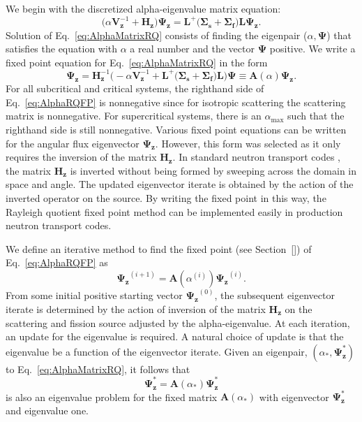 We begin with the discretized alpha-eigenvalue matrix equation:
\begin{equation}
	\big ( \alpha \mathbf{V}_{\mathbf{z}}^{-1} + \mathbf{H_{z}} \big ) \mathbf{\Psi_{z}} = \mathbf{L}^{+} \big ( \mathbf{\Sigma_{s}} + \mathbf{\Sigma_{f}} \big ) \mathbf{L} \mathbf{\Psi_{z}}.
	\label{eq:AlphaMatrixRQ}
\end{equation}
Solution of Eq.~\ref{eq:AlphaMatrixRQ} consists of finding the eigenpair ($\alpha,\mathbf{\Psi}$) that satisfies the equation with $\alpha$ a real number and the vector $\mathbf{\Psi}$ positive. We write a fixed point equation for Eq.~\ref{eq:AlphaMatrixRQ} in the form
\begin{equation}
	\mathbf{\Psi_{z}} = \mathbf{H}^{-1}_{\mathbf{z}} \big ( -\alpha \mathbf{V}_{\mathbf{z}}^{-1} + \mathbf{L}^{+} \big ( \mathbf{\Sigma_{s}} + \mathbf{\Sigma_{f}} \big ) \mathbf{L} \big ) \mathbf{\Psi} \equiv \mathbf{A}(\alpha) \mathbf{\Psi_{z}}.
	\label{eq:AlphaRQFP}
\end{equation}
For all subcritical and critical systems, the righthand side of Eq.~\ref{eq:AlphaRQFP} is nonnegative since for isotropic scattering the scattering matrix is nonnegative. For supercritical systems, there is an $\alpha_{\text{max}}$ such that the righthand side is still nonnegative. Various fixed point equations can be written for the angular flux eigenvector $\mathbf{\Psi_{z}}$. However, this form was selected as it only requires the inversion of the matrix $\mathbf{H_{z}}$. In standard neutron transport codes \cite{hanebutte_ardra_1999} \cite{alcouffe2005partisn}, the matrix $\mathbf{H_{z}}$ is inverted without being formed by sweeping across the domain in space and angle. The updated eigenvector iterate is obtained by the action of the inverted operator on the source. By writing the fixed point in this way, the Rayleigh quotient fixed point method can be implemented easily in production neutron transport codes.

We define an iterative method to find the fixed point (see Section~\ref{}) of Eq.~\ref{eq:AlphaRQFP} as
\begin{equation}
	\mathbf{\Psi_{z}}^{(i+1)} = \mathbf{A}(\alpha^{(i)}) \mathbf{\Psi_{z}}^{(i)}.
\end{equation}
From some initial positive starting vector $\mathbf{\Psi_{z}}^{(0)}$, the subsequent eigenvector iterate is determined by the action of inversion of the matrix $\mathbf{H_{z}}$ on the scattering and fission source adjusted by the alpha-eigenvalue. At each iteration, an update for the eigenvalue is required. A natural choice of update is that the eigenvalue be a function of the eigenvector iterate. Given an eigenpair, $(\alpha_{*}, \mathbf{\Psi_{z}^{*}})$ to Eq.~\ref{eq:AlphaMatrixRQ}, it follows that
\begin{equation}
	\mathbf{\Psi_{z}^{*}} =  \mathbf{A}(\alpha_{*}) \mathbf{\Psi_{z}^{*}}
\end{equation}
is also an eigenvalue problem for the fixed matrix $\mathbf{A}(\alpha_{*})$ with eigenvector $\mathbf{\Psi}_{\mathbf{z}}^{*}$ and eigenvalue one.

